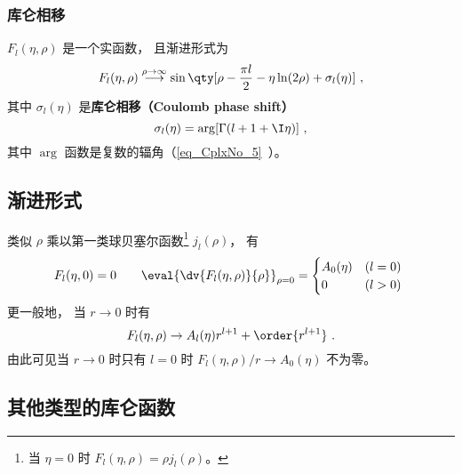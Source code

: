 \subsubsection{库仑相移}
$F_l(\eta, \rho)$ 是一个实函数， 且渐进形式为
\begin{equation}\label{eq_CulmF_7} %
F_l(\eta, \rho) \overset{\rho\to \infty}{\longrightarrow} \sin\qty[\rho - \frac{\pi l}{2} - \eta\ln(2\rho) + \sigma_l(\eta)]~,
\end{equation}
其中 $\sigma_l(\eta)$ 是\textbf{库仑相移（Coulomb phase shift）}
\begin{equation}\label{eq_CulmF_8}
\sigma_l(\eta) = \arg[\Gamma(l+1+\I\eta)]~,
\end{equation}
其中 $\arg$ 函数是复数的辐角（\autoref{eq_CplxNo_5}~）。

\subsection{渐进形式}
类似 $\rho$ 乘以第一类球贝塞尔函数\footnote{当 $\eta = 0$ 时 $F_l(\eta, \rho)=\rho j_l(\rho)$。} $j_l(\rho)$， 有
\begin{equation}
F_l(\eta, 0) = 0 \qquad \eval{\dv{F_l(\eta, \rho)}{\rho}}_{\rho=0} = 
\begin{cases}
A_0(\eta) &(l = 0)\\
0     &(l > 0)
\end{cases}~
\end{equation}
更一般地， 当 $r\to 0$ 时有
\begin{equation} %
F_l(\eta, \rho) \rightarrow A_l(\eta) r^{l+1} + \order{r^{l+1}}~.
\end{equation}
由此可见当 $r\to 0$ 时只有 $l = 0$ 时 $F_l(\eta, \rho)/r \to A_0(\eta)$ 不为零。

\subsection{其他类型的库仑函数}


